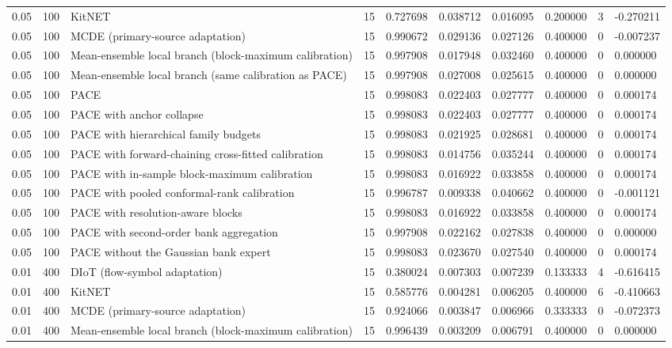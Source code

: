 \begin{tabular}{llllllllll}
0.05 & 100 & KitNET & 15 & 0.727698 & 0.038712 & 0.016095 & 0.200000 & 3 & -0.270211 \\
0.05 & 100 & MCDE (primary-source adaptation) & 15 & 0.990672 & 0.029136 & 0.027126 & 0.400000 & 0 & -0.007237 \\
0.05 & 100 & Mean-ensemble local branch (block-maximum calibration) & 15 & 0.997908 & 0.017948 & 0.032460 & 0.400000 & 0 & 0.000000 \\
0.05 & 100 & Mean-ensemble local branch (same calibration as PACE) & 15 & 0.997908 & 0.027008 & 0.025615 & 0.400000 & 0 & 0.000000 \\
0.05 & 100 & PACE & 15 & 0.998083 & 0.022403 & 0.027777 & 0.400000 & 0 & 0.000174 \\
0.05 & 100 & PACE with anchor collapse & 15 & 0.998083 & 0.022403 & 0.027777 & 0.400000 & 0 & 0.000174 \\
0.05 & 100 & PACE with hierarchical family budgets & 15 & 0.998083 & 0.021925 & 0.028681 & 0.400000 & 0 & 0.000174 \\
0.05 & 100 & PACE with forward-chaining cross-fitted calibration & 15 & 0.998083 & 0.014756 & 0.035244 & 0.400000 & 0 & 0.000174 \\
0.05 & 100 & PACE with in-sample block-maximum calibration & 15 & 0.998083 & 0.016922 & 0.033858 & 0.400000 & 0 & 0.000174 \\
0.05 & 100 & PACE with pooled conformal-rank calibration & 15 & 0.996787 & 0.009338 & 0.040662 & 0.400000 & 0 & -0.001121 \\
0.05 & 100 & PACE with resolution-aware blocks & 15 & 0.998083 & 0.016922 & 0.033858 & 0.400000 & 0 & 0.000174 \\
0.05 & 100 & PACE with second-order bank aggregation & 15 & 0.997908 & 0.022162 & 0.027838 & 0.400000 & 0 & 0.000000 \\
0.05 & 100 & PACE without the Gaussian bank expert & 15 & 0.998083 & 0.023670 & 0.027540 & 0.400000 & 0 & 0.000174 \\
0.01 & 400 & DIoT (flow-symbol adaptation) & 15 & 0.380024 & 0.007303 & 0.007239 & 0.133333 & 4 & -0.616415 \\
0.01 & 400 & KitNET & 15 & 0.585776 & 0.004281 & 0.006205 & 0.400000 & 6 & -0.410663 \\
0.01 & 400 & MCDE (primary-source adaptation) & 15 & 0.924066 & 0.003847 & 0.006966 & 0.333333 & 0 & -0.072373 \\
0.01 & 400 & Mean-ensemble local branch (block-maximum calibration) & 15 & 0.996439 & 0.003209 & 0.006791 & 0.400000 & 0 & 0.000000 \\

\end{tabular}
